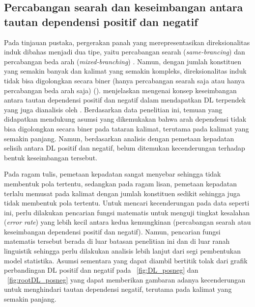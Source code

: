 \subsection{Percabangan searah dan keseimbangan antara tautan dependensi positif dan negatif}
Pada tinjauan pustaka, pergerakan panah yang merepresentasikan direksionalitas induk dibahas menjadi dua tipe, yaitu percabangan searah (\textit{same-brancing}) dan percabangan beda arah (\textit{mixed-branching}) \citep{hawkins1994performance}. Namun, dengan jumlah konstituen yang semakin banyak dan kalimat yang semakin kompleks, direksionalitas induk tidak bisa digolongkan secara biner (hanya percabangan searah saja atau hanya percabangan beda arah saja) (\citealp{dryer1992greenbergian, temperley2008dependency}). \cite{gildea2010grammars} menjelaskan mengenai konsep keseimbangan antara tautan dependensi positif dan negatif dalam mendapatkan DL terpendek yang juga dianalisis oleh \citep{dryer1992greenbergian}. Berdasarkan data penelitian ini, temuan yang didapatkan mendukung asumsi yang dikemukakan \cite{dryer1992greenbergian} bahwa arah dependensi tidak bisa digolongkan secara biner pada tataran kalimat, terutama pada kalimat yang semakin panjang. Namun, berdasarkan analisis dengan pemetaan kepadatan selisih antara DL positif dan negatif, belum ditemukan kecenderungan terhadap bentuk keseimbangan tersebut. 

Pada ragam tulis, pemetaan kepadatan sangat menyebar sehingga tidak membentuk pola tertentu, sedangkan pada ragam lisan, pemetaan kepadatan terlalu memusat pada kalimat dengan jumlah konstituen sedikit sehingga juga tidak membentuk pola tertentu. Untuk mencari kecenderungan pada data seperti ini, perlu dilakukan pencarian fungsi matematis untuk menguji tingkat kesalahan (\textit{error rate}) yang lebih kecil antara kedua kemungkinan (percabangan searah atau keseimbangan dependensi positif dan negatif). Namun, pencarian fungsi matematis tersebut berada di luar batasan penelitian ini dan di luar ranah linguistik sehingga perlu dilakukan analisis lebih lanjut dari segi pembentukan model statistika. Asumsi sementara yang dapat diambil bertitik tolak dari grafik perbandingan DL positif dan negatif pada \pic~\ref{fig:DL_posneg} dan \pic~\ref{fig:rootDL_posneg} yang dapat memberikan gambaran adanya kecenderungan untuk menghindari tautan dependensi negatif, terutama pada kalimat yang semakin panjang.

